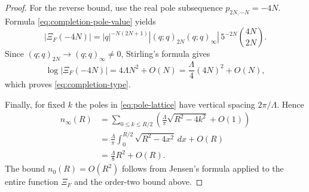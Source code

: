 \documentclass[10pt,a4paper]{amsart}
\begin{document}
\begin{proof}
For the reverse bound, use the real pole subsequence $p_{2N,-N}=-4N$.  Formula \eqref{eq:completion-pole-value} yields
\[
|\Xi_F(-4N)|
=|q|^{-N(2N+1)}
|(q;q)_{2N}(q;q)_\infty|
\,5^{-2N}\binom{4N}{2N}.
\]
Since $(q;q)_{2N}\to(q;q)_\infty\ne0$, Stirling's formula gives
\[
\log|\Xi_F(-4N)|
=4\Lambda N^2+O(N)
=\frac{\Lambda}{4}(4N)^2+O(N),
\]
which proves \eqref{eq:completion-type}.

Finally, for fixed $k$ the poles in \eqref{eq:pole-lattice} have vertical spacing $2\pi/\Lambda$.  Hence
\begin{align*}
n_\infty(R)
&=\sum_{0\le k\le R/2}
\left(\frac{\Lambda}{\pi}\sqrt{R^2-4k^2}+O(1)\right)\\
&=\frac{\Lambda}{\pi}
\int_0^{R/2}\sqrt{R^2-4x^2}\,dx+O(R)\\
&=\frac{\Lambda}{8}R^2+O(R).
\end{align*}
The bound $n_0(R)=O(R^2)$ follows from Jensen's formula applied to the entire function $\Xi_F$ and the order-two bound above.
\end{proof}
\end{document}
